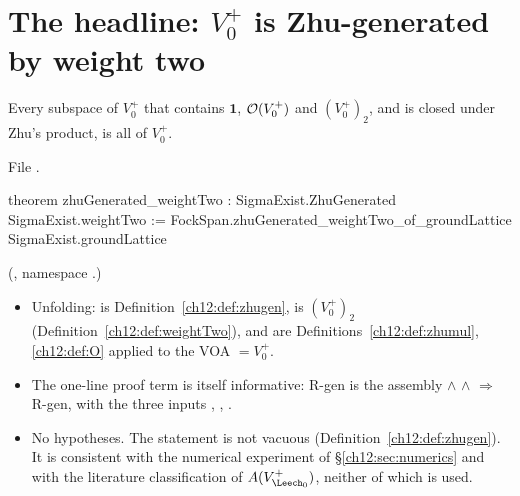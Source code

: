 \section{The headline: \texorpdfstring{$V_0^+$}{V₀⁺} is Zhu-generated by weight two}\label{ch12:sec:headline}

\begin{theorem}[R-gen]\label{ch12:thm:zhuGenerated_weightTwo}
Every subspace of $V_0^+$ that contains $\mathbf 1$, $\mathcal{O}(V_0^+)$ and $(V_0^+)_2$, and is closed under
Zhu's product, is all of $V_0^+$.
\end{theorem}
File .
\begin{leancode}
theorem zhuGenerated_weightTwo : SigmaExist.ZhuGenerated SigmaExist.weightTwo :=
  FockSpan.zhuGenerated_weightTwo_of_groundLattice SigmaExist.groundLattice
\end{leancode}
(, namespace .)
\begin{dictionary}
\begin{itemize}
\item Unfolding:  is Definition~\ref{ch12:def:zhugen},  is
  $(V_0^+)_2$ (Definition~\ref{ch12:def:weightTwo}),  and  are
  Definitions~\ref{ch12:def:zhumul}, \ref{ch12:def:O} applied to the VOA  $=V_0^+$.
\item The one-line proof term is itself informative: R-gen is the assembly
   $\wedge$  $\wedge$  $\Rightarrow$ R-gen,
  with the three inputs , , .
\item No hypotheses.  The statement is not vacuous (Definition~\ref{ch12:def:zhugen}).  It is
  consistent with the numerical experiment of \S\ref{ch12:sec:numerics} and with the literature
  classification of $A(V_{\Leech_0}^+)$, neither of which is used.
\end{itemize}
\end{dictionary}

